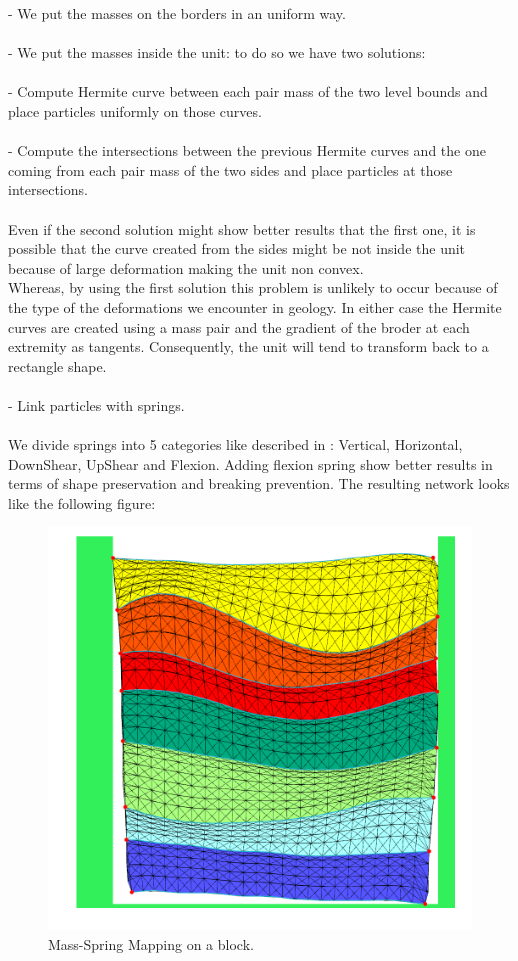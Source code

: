 \documentclass[12pt, a4paper]{report} %
\begin{document}
\indent	- We put the masses on the borders in an uniform way.\\\\
\indent	- We put the masses inside the unit: to do so we have two solutions:\\\\
\indent \indent	- Compute Hermite curve between each pair mass of the two level bounds and place particles uniformly on those curves.\\\\
\indent \indent	- Compute the intersections between the previous Hermite curves and the one coming from each pair mass of the two sides and place particles at those intersections.\\\\
	Even if the second solution might show better results that the first one, it is possible that the curve created from the sides might be not inside the unit because of large deformation making the unit non convex. \\Whereas, by using the first solution this problem is unlikely to occur because of the type of the deformations we encounter in geology. In either case the Hermite curves are created using a mass pair and the gradient of the broder at each extremity as tangents. Consequently, the unit will tend to transform back to a rectangle shape.\\\\
\indent	- Link particles with springs. \\\\We divide springs into 5 categories like described in \cite{cloth}: Vertical, Horizontal, DownShear, UpShear and Flexion. Adding flexion spring show better results in terms of shape preservation and breaking prevention. The resulting network looks like the following figure:\\
	
	\begin{figure}[H]
	\centering
	\includegraphics[scale=0.5]{springMapping.png}
	\caption{Mass-Spring Mapping on a block.}
	\end{figure}
	
\end{document}
